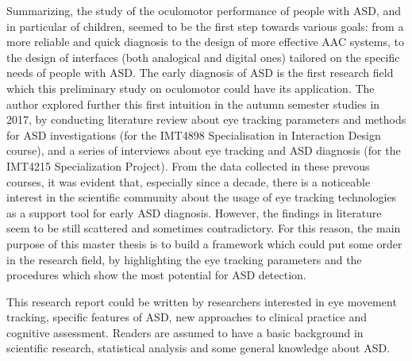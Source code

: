 Summarizing, the study of the oculomotor performance of people with ASD, and in particular of children, seemed to be the first step towards various goals: from a more reliable and quick diagnosis to the design of more effective AAC systems, to the design of interfaces (both analogical and digital ones) tailored on the specific needs of people with ASD.
The early diagnosis of ASD is the first research field which this preliminary study on oculomotor could have its application.
The author explored further this first intuition in the autumn semester studies in 2017, by conducting literature review about eye tracking parameters and methods for ASD investigations (for the IMT4898 Specialisation in Interaction Design course), and a series of interviews 
about eye tracking and ASD diagnosis (for the IMT4215 Specialization Project). From the data collected in these prevous courses, it was evident that, especially since a decade, there is a noticeable interest in the scientific community about the usage of eye tracking technologies as a support tool for early ASD diagnosis. However, the findings in literature seem to be still scattered and sometimes contradictory. For this reason, the main purpose of this master thesis is to build a framework which could put some order in the research field, by highlighting the eye tracking parameters and the procedures which show the most potential for ASD detection.

This research report could be written by researchers interested in eye movement tracking, specific features of ASD, new approaches to clinical practice and cognitive assessment.
Readers are assumed to have a basic background in scientific research, statistical analysis and some general knowledge about ASD.\\[2cm]

\thesisdate \\[1pc]
\\[1pc]
